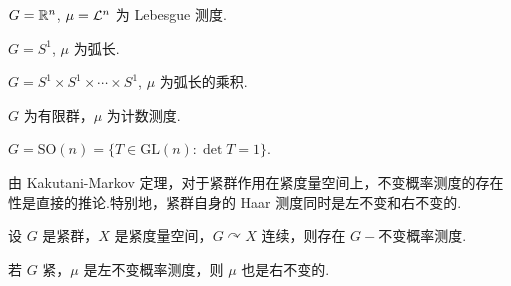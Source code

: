 \begin{instance}
$G = \mathbb{R}^n$, $\mu = \mathcal{L}^n$ 为 Lebesgue 测度.\par
$G = S^1$, $\mu$ 为弧长.\par
$G = S^1 \times S^1 \times \cdots \times S^1$, $\mu$ 为弧长的乘积.\par
$G$ 为有限群，$\mu$ 为计数测度.\par
$G = \mathrm{SO}(n) = \{T \in \mathrm{GL}(n): \det T = 1\}$.
\end{instance}

由 Kakutani-Markov 定理，对于紧群作用在紧度量空间上，不变概率测度的存在性是直接的推论.特别地，紧群自身的 Haar 测度同时是左不变和右不变的.

\begin{corollary}
设 $G$ 是紧群，$X$ 是紧度量空间，$G \curvearrowright X$ 连续，则存在 $G-\!\!$不变概率测度.\par
若 $G$ 紧，$\mu$ 是左不变概率测度，则 $\mu$ 也是右不变的.
\end{corollary}
